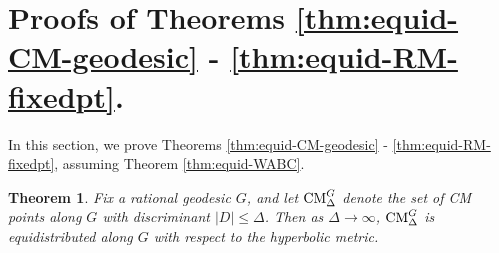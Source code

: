 \documentclass[11pt,letterpaper,reqno]{amsart}
\newtheorem{theorem}{Theorem}[section]
\numberwithin{equation}{section}
\numberwithin{figure}{section}
\numberwithin{table}{section}
\newcommand{\CM}{\textnormal{CM}}
\begin{document}
\section{Proofs of Theorems \ref{thm:equid-CM-geodesic} - \ref{thm:equid-RM-fixedpt}.}
\label{sec:proof-main-theorems}

In this section, we prove Theorems \ref{thm:equid-CM-geodesic} - \ref{thm:equid-RM-fixedpt}, assuming Theorem \ref{thm:equid-WABC}.

{
\renewcommand{\thetheorem}{\ref{thm:equid-CM-geodesic}}
\begin{theorem} 
    Fix a rational geodesic $G$, and let 
    $\CM^{G}_{\Delta}$ denote the set of CM points along $G$ with discriminant $|D| \le \Delta$. 
    Then as $\Delta \to \infty$, $\CM^{G}_{\Delta}$ is equidistributed along $G$ with respect to the hyperbolic metric.
\end{theorem}
\addtocounter{theorem}{-1}
}
\end{document}
